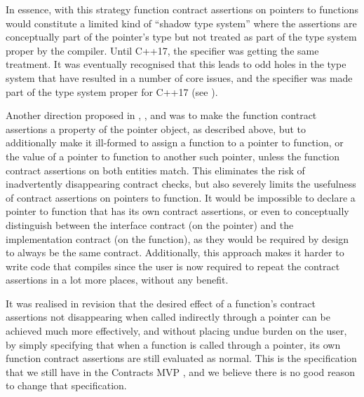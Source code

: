 
In essence, with this strategy function contract assertions on pointers to functions would constitute a limited kind of ``shadow type system'' where the assertions are conceptually part of the pointer's type but not treated as part of the type system proper by the compiler. Until C++17, the  specifier was getting the same treatment. It was eventually recognised that this leads to odd holes in the type system that have resulted in a number of core issues, and the  specifier was made part of the type system proper for C++17 (see \cite{P0012R1}).

Another direction proposed in \cite{N4415}, \cite{P0287R0}, and \cite{P0380R0} was to make the function contract assertions a property of the pointer object, as described above, but to additionally make it ill-formed to assign a function to a pointer to function, or the value of a pointer to function to another such pointer, unless the function contract assertions on both entities match. This eliminates the risk of inadvertently disappearing contract checks, but also severely limits the usefulness of contract assertions on pointers to function. It would be impossible to declare a pointer to function that has its own contract assertions, or even to conceptually distinguish between the interface contract (on the pointer) and the implementation contract (on the function), as they would be required by design to always be the same contract. Additionally, this approach makes it harder to write code that compiles since the user is now required to repeat the contract assertions in a lot more places, without any benefit.


It was realised in revision \cite{P0380R1} that the desired effect of a function's contract assertions not disappearing when called indirectly through a pointer can be achieved much more effectively, and without placing undue burden on the user, by simply specifying that when a function is called through a pointer, its own function contract assertions are still evaluated as normal. This is the specification that we still have in the Contracts MVP \cite{P2900R7}, and we believe there is no good reason to change that specification.

